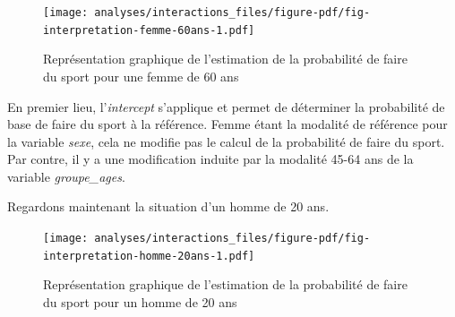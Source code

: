 \documentclass[
  letterpaper,
  DIV=11,
  numbers=noendperiod,
  oneside]{scrreprt}
\newenvironment{Shaded}{\begin{snugshade}}{\end{snugshade}}
\newcommand{\AttributeTok}[1]{\textcolor[rgb]{0.40,0.45,0.13}{#1}}
\newcommand{\DecValTok}[1]{\textcolor[rgb]{0.68,0.00,0.00}{#1}}
\newcommand{\FloatTok}[1]{\textcolor[rgb]{0.68,0.00,0.00}{#1}}
\newcommand{\FunctionTok}[1]{\textcolor[rgb]{0.28,0.35,0.67}{#1}}
\newcommand{\NormalTok}[1]{\textcolor[rgb]{0.00,0.23,0.31}{#1}}
\newcommand{\OtherTok}[1]{\textcolor[rgb]{0.00,0.23,0.31}{#1}}
\newcommand{\SpecialCharTok}[1]{\textcolor[rgb]{0.37,0.37,0.37}{#1}}
\newcommand{\StringTok}[1]{\textcolor[rgb]{0.13,0.47,0.30}{#1}}
\begin{document}
\begin{figure}[H]

{\centering \texttt{[image: analyses/interactions\_files/figure-pdf/fig-interpretation-femme-60ans-1.pdf]}

}

\caption{\label{fig-interpretation-femme-60ans}Représentation graphique
de l'estimation de la probabilité de faire du sport pour une femme de 60
ans}

\end{figure}

En premier lieu, l'\emph{intercept} s'applique et permet de déterminer
la probabilité de base de faire du sport à la référence. Femme étant la
modalité de référence pour la variable \emph{sexe}, cela ne modifie pas
le calcul de la probabilité de faire du sport. Par contre, il y a une
modification induite par la modalité 45-64 ans de la variable
\emph{groupe\_ages}.

Regardons maintenant la situation d'un homme de 20 ans.

\begin{Shaded}
\end{Shaded}

\begin{figure}[H]

{\centering \texttt{[image: analyses/interactions\_files/figure-pdf/fig-interpretation-homme-20ans-1.pdf]}

}

\caption{\label{fig-interpretation-homme-20ans}Représentation graphique
de l'estimation de la probabilité de faire du sport pour un homme de 20
ans}

\end{figure}
\end{document}
